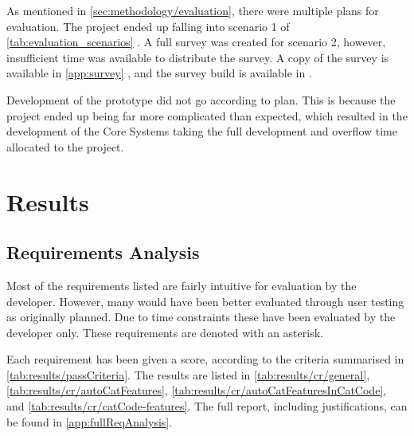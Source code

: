 %

As mentioned in \autoref{sec:methodology/evaluation}, there were multiple plans for evaluation. The project ended up falling into scenario 1 of \autoref{tab:evaluation_scenarios} . A full survey was created for scenario 2, however, insufficient time was available to distribute the survey. A copy of the survey is available in \autoref{app:survey} , and the survey build is available in .

Development of the prototype did not go according to plan. This is because the project ended up being far more complicated than expected, which resulted in the development of the Core Systems taking the full development and overflow time allocated to the project.

\section{Results}

\subsection{Requirements Analysis}\label{sec:results/reqAnalysis}
Most of the requirements listed are fairly intuitive for evaluation by the developer. However, many would have been better evaluated through user testing as originally planned. Due to time constraints these have been evaluated by the developer only. These requirements are denoted with an asterisk.

Each requirement has been given a score, according to the criteria summarised in \autoref{tab:results/passCriteria}. The results are listed in \autoref{tab:results/cr/general}, \ref{tab:results/cr/autoCatFeatures}, \ref{tab:results/cr/autoCatFeaturesInCatCode}, and \ref{tab:results/cr/catCode-features}. The full report, including justifications, can be found in \autoref{app:fullReqAnalysis}.

